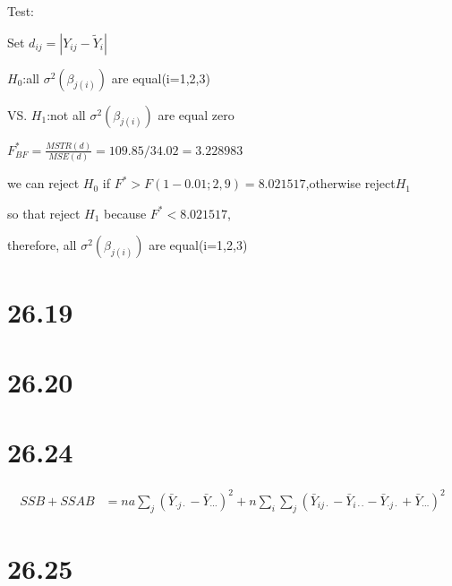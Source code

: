 \documentclass{article}\usepackage[]{graphicx}\usepackage[]{color}
\begin{document}
\begin{enumerate}[(a)]
Test:

Set $d_{ij} = | Y_{ij} - \tilde{Y}_i |$

\begin{center}
$H_0$:all $\sigma^2(\beta_{j(i)})$ are equal(i=1,2,3)

VS. $H_1$:not all $\sigma^2(\beta_{j(i)})$ are equal zero

$F^*_{BF}=\frac{MSTR(d)}{MSE(d)} = 109.85/34.02  = 3.228983$

we can reject $H_0$ if $F^* > F(1-0.01;2,9)=8.021517$,otherwise reject$H_1$

so that reject $H_1$ because $F^*<8.021517$,

therefore, all $\sigma^2(\beta_{j(i)})$ are equal(i=1,2,3)
\end{center}

\end{enumerate}

\section{26.19}

\section{26.20}

\section{26.24}

\begin{displaymath}
\begin{split}
SSB+SSAB &= na\sum_{j}(\bar{Y}_{\cdot j \cdot}-\bar{Y}_{\cdots})^2 + n\sum_i\sum_j(\bar{Y}_{ij\cdot}-\bar{Y}_{i\cdot\cdot}-\bar{Y}_{\cdot j \cdot}+\bar{Y}_{\cdots})^2
\end{split}
\end{displaymath}

\section{26.25}
\end{document}

